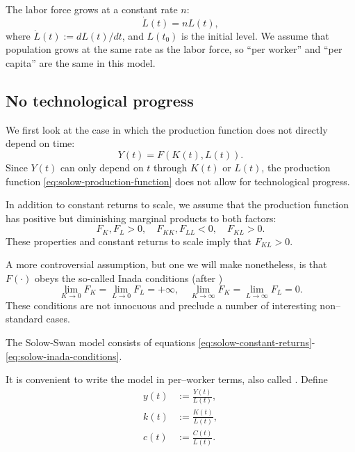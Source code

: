 \documentclass[\topdir/lecture\_notes.tex]{subfiles}
\begin{document}
The labor force grows at a constant rate $n$:
\begin{equation}
  \dot{L}(t)=n L(t), \label{eq:solow-labor-growth}
\end{equation}
where $\dot{L}(t) := dL(t) / dt$, and $L(t_{0})$ is the initial level.
We assume that population grows at the same rate as the labor force, so ``per worker'' and ``per capita'' are the same in this model.

\subsection{No technological progress}
We first look at the case in which the production function does not directly depend on time:
\begin{equation}
  Y(t)=F(K(t), L(t)). \label{eq:solow-production-no-tech}
\end{equation}
Since $Y(t)$ can only depend on $t$ through $K(t)$ or $L(t)$, the production function \eqref{eq:solow-production-function} does not allow for technological progress.

In addition to constant returns to scale, we assume that the production function has positive but diminishing marginal products to both factors:
\begin{equation}
  F_{K}, F_{L}>0, \quad F_{K K}, F_{L L}<0, \quad F_{K L}>0. \label{eq:solow-marginal-products}
\end{equation}
These properties and constant returns to scale imply that $F_{K L}>0$.

A more controversial assumption, but one we will make nonetheless, is that $F(\cdot)$ obeys the so-called Inada conditions (after \parencite{inada1963conditions})
\begin{equation}
  \lim _{K \rightarrow 0} F_{K}=\lim _{L \rightarrow 0} F_{L}=+\infty, \quad \lim _{K \rightarrow \infty} F_{K}=\lim _{L \rightarrow \infty} F_{L}=0. \label{eq:solow-inada-conditions}
\end{equation}
These conditions are not innocuous and preclude a number of interesting non--standard cases.

The Solow-Swan model consists of equations \eqref{eq:solow-constant-returns}-\eqref{eq:solow-inada-conditions}.

It is convenient to write the model in per--worker terms, also called .
Define
\begin{align*}
  y(t) &:= \frac{Y(t)}{L(t)}, \\
  k(t) &:= \frac{K(t)}{L(t)}, \\
  c(t) &:= \frac{C(t)}{L(t)}.
\end{align*}
\end{document}
